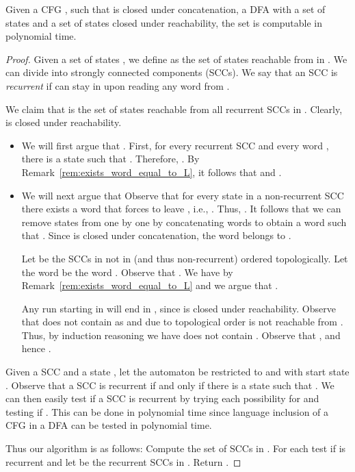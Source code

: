 \documentclass{CSML}
\begin{document}
\begin{lem}
Given a CFG , such that  is closed under concatenation, a DFA  with a set of states  and a set of states  closed under reachability, 
the set  is computable in polynomial time.
\label{l:compute-reachable-states}
\end{lem}
\begin{proof}
Given a set of states , we define  as the set of states reachable from  in .
We can divide  into strongly connected components (SCCs). 
We say that an SCC  is \emph{recurrent} if  can stay in  upon reading any word from .


We claim that  is the set of states  reachable from all recurrent SCCs in . Clearly,  is closed under reachability.
\begin{itemize}
\item We will first argue that .
First, for every recurrent SCC  and every word , there is a state  such that 
. Therefore, . By Remark~\ref{rem:exists_word_equal_to_L}, it follows that  and . 

\item We will next argue that 
Observe that for every state  in a non-recurrent SCC  there exists a word  that forces  to leave , i.e.,
. Thus, . It follows that we can remove states from 
one by one by concatenating words  to obtain a word  such that .
Since  is closed under concatenation, the word  belongs to .

Let  be the SCCs in  not in  (and thus non-recurrent) ordered topologically. Let the word  be the word .  Observe that . 
We have  by Remark~\ref{rem:exists_word_equal_to_L} and we argue that . 

Any run starting in  will end in , since  is closed under reachability. 
Observe that  does not contain  as 
 and due to topological order  is not reachable from .
Thus, by induction reasoning we have  does not 
contain . Observe that 
, 
and hence . 



 
\end{itemize}


\noindent Given a SCC  and a state , let the automaton  be  restricted to  and with start state .
Observe that a SCC  is recurrent if and only if there is a state  such that . We can then easily test if a SCC is recurrent by trying each possibility for  and testing if . This can be done in polynomial time since language inclusion of a CFG in a DFA can be tested in polynomial time.

Thus our algorithm is as follows: Compute the set  of SCCs in . For each  test if  is recurrent and let  be the recurrent SCCs in . Return .
\end{proof}
\end{document}
